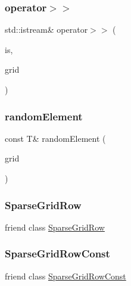 \subsubsection{\texorpdfstring{operator$>$$>$}{operator>>}}
{\footnotesize\ttfamily std\+::istream\& operator$>$$>$ (\begin{DoxyParamCaption}\item[{std\+::istream \&}]{is,  }\item[{\mbox{\hyperlink{classSparseGrid}{Sparse\+Grid}}$<$ T $>$ \&}]{grid }\end{DoxyParamCaption})\hspace{0.3cm}{\ttfamily [friend]}}

\mbox{\label{classSparseGrid_adb322a887d81f108ab54909e1ceacc84}} 
\subsubsection{\texorpdfstring{random\+Element}{randomElement}}
{\footnotesize\ttfamily const T\& random\+Element (\begin{DoxyParamCaption}\item[{const \mbox{\hyperlink{classSparseGrid}{Sparse\+Grid}}$<$ T $>$ \&}]{grid }\end{DoxyParamCaption})\hspace{0.3cm}{\ttfamily [friend]}}

\mbox{\label{classSparseGrid_a7b596e3a8decb7689f3928f0846b5b74}} 
\subsubsection{\texorpdfstring{Sparse\+Grid\+Row}{SparseGridRow}}
{\footnotesize\ttfamily friend class \mbox{\hyperlink{classSparseGrid_1_1SparseGridRow}{Sparse\+Grid\+Row}}\hspace{0.3cm}{\ttfamily [friend]}}

\mbox{\label{classSparseGrid_adb9d25de8bb6fb2ec916926f16f49d68}} 
\subsubsection{\texorpdfstring{Sparse\+Grid\+Row\+Const}{SparseGridRowConst}}
{\footnotesize\ttfamily friend class \mbox{\hyperlink{classSparseGrid_1_1SparseGridRowConst}{Sparse\+Grid\+Row\+Const}}\hspace{0.3cm}{\ttfamily [friend]}}

